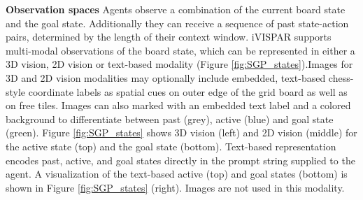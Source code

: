 \textbf{Observation spaces}\hspace{.3cm} Agents observe a combination of the current board state and the goal state. Additionally they can receive a sequence of past state-action pairs, determined by the length of their context window. iVISPAR supports multi-modal observations of the board state, which can be represented in either a 3D vision, 2D vision or text-based modality (Figure \ref{fig:SGP_states}).Images for 3D and 2D vision modalities may optionally include embedded, text-based chess-style coordinate labels as spatial cues on outer edge of the grid board as well as on free tiles. Images can also marked with an embedded text label and a colored background to differentiate between past (grey), active (blue) and goal state (green). Figure \ref{fig:SGP_states} shows 3D vision (left) and 2D vision (middle) for the active state (top) and the goal state (bottom). Text-based representation encodes past, active, and goal states directly in the prompt string supplied to the agent. A visualization of the text-based active (top) and goal states (bottom) is shown in Figure \ref{fig:SGP_states} (right). Images are not used in this modality.